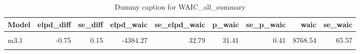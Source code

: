 \begin{table}
\centering
\caption{Dummy caption for WAIC_all_summary}
\centering
\fontsize{10}{12}\selectfont
\begin{tabular}[t]{lrrrrrrrr}
\toprule
Model & elpd\_diff & se\_diff & elpd\_waic & se\_elpd\_waic & p\_waic & se\_p\_waic & waic & se\_waic\\
\midrule
\cellcolor{gray!10}{m2} & \cellcolor{gray!10}{0.00} & \cellcolor{gray!10}{0.00} & \cellcolor{gray!10}{-4383.52} & \cellcolor{gray!10}{32.76} & \cellcolor{gray!10}{30.66} & \cellcolor{gray!10}{0.39} & \cellcolor{gray!10}{8767.03} & \cellcolor{gray!10}{65.51}\\
m3.1 & -0.75 & 0.15 & -4384.27 & 32.79 & 31.41 & 0.41 & 8768.54 & 65.57\\
\cellcolor{gray!10}{m4} & \cellcolor{gray!10}{-1.37} & \cellcolor{gray!10}{2.52} & \cellcolor{gray!10}{-4384.88} & \cellcolor{gray!10}{32.83} & \cellcolor{gray!10}{34.98} & \cellcolor{gray!10}{0.45} & \cellcolor{gray!10}{8769.77} & \cellcolor{gray!10}{65.66}\\
\bottomrule
\end{tabular}
\end{table}

